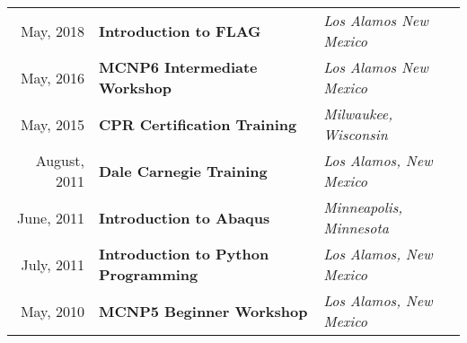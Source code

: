 
\begin{minipage}{\textwidth}
	\begin{tabular}{r|ll}
 		May, 2018 & \textbf{Introduction to FLAG} &  \textit{Los Alamos New Mexico}  \\
 		May, 2016 & \textbf{MCNP6 Intermediate Workshop} &  \textit{Los Alamos New Mexico}  \\
 		May, 2015 & \textbf{CPR Certification Training}  &  \textit{Milwaukee, Wisconsin}  \\
 		August, 2011 & \textbf{Dale Carnegie Training} & \textit{Los Alamos, New Mexico}  \\
 		June, 2011 & \textbf{Introduction to Abaqus} & \textit{Minneapolis, Minnesota} \\
 		July, 2011 & \textbf{Introduction to Python Programming} & \textit{Los Alamos, New Mexico} \\
 		May, 2010 & \textbf{MCNP5 Beginner Workshop} & \textit{Los Alamos, New Mexico} \\
 	\end{tabular}
\end{minipage}
